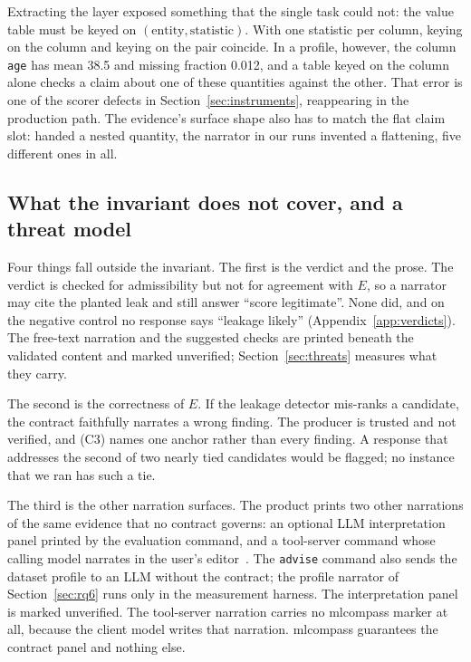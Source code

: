 \documentclass[journal]{IEEEtran}
\begin{document}
Extracting the layer exposed something that the single task could not: the
value table must be keyed on $(\text{entity}, \text{statistic})$. With one
statistic per column, keying on the column and keying on the pair coincide. In a profile, however, the
column \texttt{age} has mean 38.5 and missing fraction 0.012, and a table
keyed on the column alone checks a claim about one of these quantities against
the other. That error is one of the scorer defects in
Section~\ref{sec:instruments}, reappearing in the production path. The
evidence's surface shape also has to match the flat claim slot: handed a
nested quantity, the narrator in our runs invented a flattening, five
different ones in all.

\subsection{What the invariant does not cover, and a threat model}

Four things fall outside the invariant. The first is the verdict and the
prose. The verdict is checked for admissibility but not for agreement with
$E$, so a narrator may cite the planted leak and still answer ``score
legitimate''. None did, and on the negative control no response says
``leakage likely'' (Appendix~\ref{app:verdicts}). 
The free-text narration and the suggested checks are printed beneath the
validated content and marked unverified; Section~\ref{sec:threats} measures
what they carry.

The second is the correctness of $E$. If the leakage detector mis-ranks a
candidate, the contract faithfully narrates a wrong finding. The producer is
trusted and not verified, and (C3) names one anchor rather than every
finding. A response that addresses the second of two nearly tied candidates
would be flagged; no instance that we ran has such a tie.

The third is the other narration surfaces. The product prints two other
narrations of the same evidence that no contract governs: an optional LLM
interpretation panel printed by the evaluation command, and a tool-server
command whose calling model narrates in the user's editor~\cite{mcp}. The
\texttt{advise} command also sends the dataset profile to an LLM without the
contract; the profile narrator of Section~\ref{sec:rq6} runs only in the
measurement harness. The
interpretation panel is marked unverified. The tool-server narration carries
no mlcompass marker at all, because the client model writes that narration.
mlcompass guarantees the contract panel and nothing else.
\end{document}
